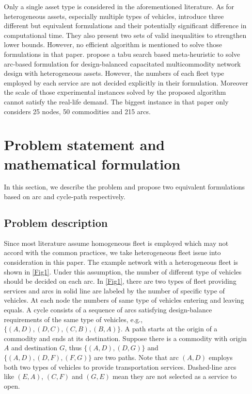 \documentclass[11pt,nonblindrev,fleqn]{article}
\begin{document}
 Only a single asset type is considered in the aforementioned literature. As for heterogeneous assets, especially multiple types of vehicles, \cite{Kim1999Multimodal} introduce three different but equivalent formulations and their potentially significant difference in computational time. They also present two sets of valid inequalities to strengthen lower bounds. However, no efficient algorithm is mentioned to solve those formulations in that paper. \cite{li2017design} propose a tabu search based meta-heuristic to solve arc-based formulation for design-balanced capacitated multicommodity network design with heterogeneous assets. However, the numbers of each fleet type employed by each service are not decided explicitly in their formulation. Moreover the scale of those experimental instances solved by the proposed algorithm cannot satisfy the real-life demand. The biggest instance in that paper only considers 25 nodes, 50 commodities and 215 arcs.

\section{Problem statement and mathematical formulation}\label{formulation}
In this section, we describe the problem and propose two equivalent formulations based on arc and cycle-path respectively.

\subsection{Problem description}
Since most literature assume homogeneous fleet is employed which may not accord with the common practices, we take heterogeneous fleet issue into consideration in this paper. The example network with a heterogeneous fleet is shown in \autoref{Fig1}. Under this assumption, the number of different type of vehicles should be decided on each arc. In \autoref{Fig1}, there are two types of fleet providing services and arcs in solid line are labeled by the number of specific type of vehicles. At each node the numbers of same type of vehicles entering and leaving equals. A cycle consists of a sequence of arcs satisfying design-balance requirements of the same type of vehicles, e.g., $\{ (A,D),(D,C),(C,B),(B,A) \}$. A path starts at the origin of a commodity and ends at its destination. Suppose there is a commodity with origin $A$ and destination $G$, thus $\{ (A,D),(D,G) \}$ and $\{ (A,D),(D,F),(F,G) \}$ are two paths. Note that arc $(A,D)$ employs both two types of vehicles to provide transportation services. Dashed-line arcs like $(E,A)$, $(C,F)$ and $(G,E)$ mean they are not selected as a service to open.
\end{document}
